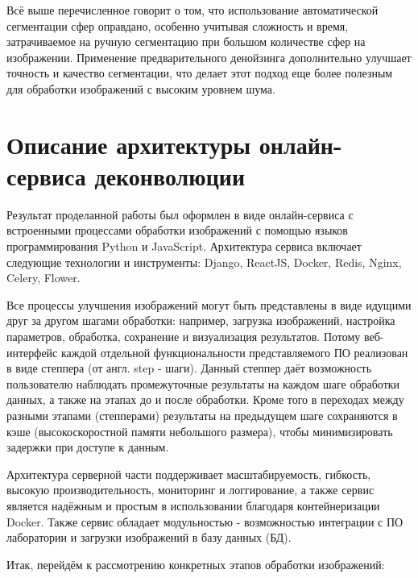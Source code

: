\par Всё выше перечисленное говорит о том, что использование автоматической сегментации сфер оправдано, особенно учитывая сложность и время, затрачиваемое на ручную сегментацию при большом количестве сфер на изображении. Применение предварительного денойзинга дополнительно улучшает точность и качество сегментации, что делает этот подход еще более полезным для обработки изображений с высоким уровнем шума. 

\section{Описание архитектуры онлайн-сервиса деконволюции}
\par Результат проделанной работы был оформлен в виде онлайн-сервиса с встроенными процессами обработки изображений с помощью языков программирования Python и JavaScript. Архитектура сервиса включает следующие технологии и инструменты: Django, ReactJS, Docker, Redis, Nginx, Celery, Flower.
\par Все процессы улучшения изображений могут быть представлены в виде идущими друг за другом шагами обработки: например, загрузка изображений, настройка параметров, обработка, сохранение и визуализация результатов. Потому веб-интерфейс каждой отдельной функциональности представляемого ПО реализован в виде степпера (от англ. step - шаги). Данный степпер даёт возможность пользователю наблюдать  промежуточные результаты на каждом шаге обработки данных, а также на этапах до и после обработки. Кроме того в переходах между разными этапами (степперами) результаты на предыдущем шаге сохраняются в кэше (высокоскоростной памяти небольшого размера), чтобы минимизировать задержки при доступе к данным. 
\par Архитектура серверной части поддерживает масштабируемость, гибкость, высокую производительность, мониторинг и логгирование, а также сервис является надёжным и простым в использовании благодаря контейнеризации Docker. Также сервис обладает модульностью - возможностью интеграции с ПО лаборатории и загрузки изображений в базу данных (БД).
\par Итак, перейдём к рассмотрению конкретных этапов обработки изображений:
